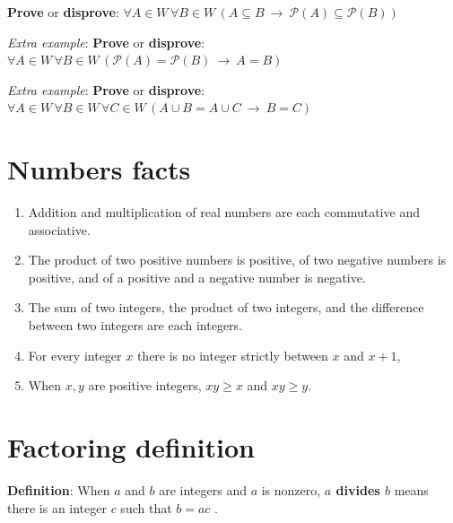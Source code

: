 \documentclass[12pt, oneside]{article}
\begin{document}
{\bf Prove} or {\bf  disprove}:  $\forall  A \in W\,  \forall B \in W\,  \left( A \subseteq B
~\to ~ \mathcal{P}(A) \subseteq \mathcal{P}(B) \right)$

\vfill
\vfill
\vfill

{\it Extra example}: {\bf Prove} or {\bf  disprove}:  $\forall  A \in W\,  \forall B \in W\,  \left( \mathcal{P}(A)  =\mathcal{P}(B)
~\to ~ A = B \right)$

\vspace{20pt}

{\it Extra example}: {\bf Prove} or {\bf  disprove}:  $\forall  A \in W\,  \forall B \in W\, \forall C  \in W\,  \left( A\cup B  = A \cup  C
~\to ~ B = C \right)$

\vspace{20pt} \vfill
\section*{Numbers facts}


\begin{enumerate}
    \item Addition and multiplication of real 
    numbers are each commutative and associative. 
    \vspace{25pt}
    \item The product of two positive numbers is positive, of 
    two negative numbers is positive, and of a positive and a negative number is negative.
    \vspace{25pt}
    \item The sum of two integers, the product of two integers, and the 
    difference between two integers are each integers.
    \vspace{25pt}
    \item For every integer $x$ there is no integer strictly between $x$ and $x+1$, 
    \vspace{25pt}
    \item When $x, y$ are positive integers, $xy \geq x$ and $xy \geq y$.
    \vspace{25pt}
\end{enumerate}
 \vfill
\section*{Factoring definition}


{\bf Definition}: When $a$ and $b$ are integers and $a$ is nonzero, 
{\bf $a$ divides $b$} means there is an integer $c$ such that $b = ac$ . 
\end{document}
